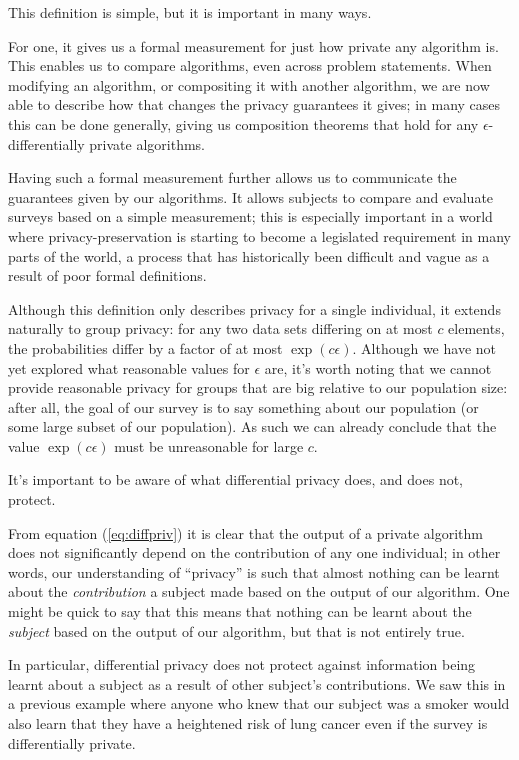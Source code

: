 This definition is simple, but it is important in many ways.

For one, it gives us a formal measurement for just how private any algorithm is. This enables us to compare algorithms, even across problem statements. When modifying an algorithm, or compositing it with another algorithm, we are now able to describe how that changes the privacy guarantees it gives; in many cases this can be done generally, giving us composition theorems that hold for any $\epsilon$-differentially private algorithms.

Having such a formal measurement further allows us to communicate the guarantees given by our algorithms. It allows subjects to compare and evaluate surveys based on a simple measurement; this is especially important in a world where privacy-preservation is starting to become a legislated requirement in many parts of the world, a process that has historically been difficult and vague as a result of poor formal definitions. \bigskip

Although this definition only describes privacy for a single individual, it extends naturally to group privacy: for any two data sets differing on at most $c$ elements, the probabilities differ by a factor of at most $\exp(c\epsilon)$. Although we have not yet explored what reasonable values for $\epsilon$ are, it's worth noting that we cannot provide reasonable privacy for groups that are big relative to our population size: after all, the goal of our survey is to say something about our population (or some large subset of our population). As such we can already conclude that the value $\exp(c\epsilon)$ must be unreasonable for large $c$.\bigskip

It's important to be aware of what differential privacy does, and does not, protect.

From equation (\ref{eq:diffpriv}) it is clear that the output of a private algorithm does not significantly depend on the contribution of any one individual; in other words, our understanding of ``privacy'' is such that almost nothing can be learnt about the \emph{contribution} a subject made based on the output of our algorithm. One might be quick to say that this means that nothing can be learnt about the \emph{subject} based on the output of our algorithm, but that is not entirely true.

In particular, differential privacy does not protect against information being learnt about a subject as a result of other subject's contributions. We saw this in a previous example where anyone who knew that our subject was a smoker would also learn that they have a heightened risk of lung cancer even if the survey is differentially private.

